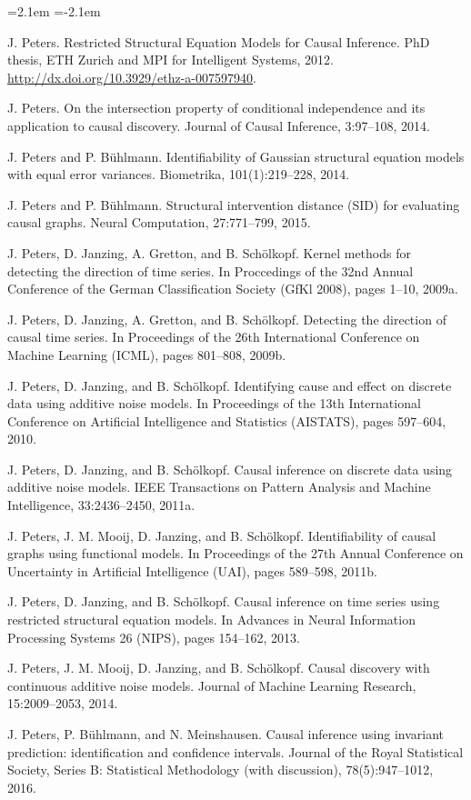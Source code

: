 \begin{list}{}{\leftmargin=2.1em
 \itemindent=-2.1em\parsep=0pt\itemsep=3pt}
\item J. Peters. Restricted Structural Equation Models for Causal Inference. PhD thesis, ETH Zurich and MPI for Intelligent Systems, 2012. \url{http://dx.doi.org/10.3929/ethz-a-007597940}.
\item J. Peters. On the intersection property of conditional independence and its application to causal discovery. Journal of Causal Inference, 3:97--108, 2014.
\item J. Peters and P. Bühlmann. Identifiability of Gaussian structural equation models with equal error variances. Biometrika, 101(1):219--228, 2014.
\item J. Peters and P. Bühlmann. Structural intervention distance (SID) for evaluating causal graphs. Neural Computation, 27:771--799, 2015.
\item J. Peters, D. Janzing, A. Gretton, and B. Schölkopf. Kernel methods for detecting the direction of time series. In Proccedings of the 32nd Annual Conference of the German Classification Society (GfKl 2008), pages 1--10, 2009a.
\item J. Peters, D. Janzing, A. Gretton, and B. Schölkopf. Detecting the direction of causal time series. In Proceedings of the 26th International Conference on Machine Learning (ICML), pages 801--808, 2009b.
\item J. Peters, D. Janzing, and B. Schölkopf. Identifying cause and effect on discrete data using additive noise models. In Proceedings of the 13th International Conference on Artificial Intelligence and Statistics (AISTATS), pages 597--604, 2010.
\item J. Peters, D. Janzing, and B. Schölkopf. Causal inference on discrete data using additive noise models. IEEE Transactions on Pattern Analysis and Machine Intelligence, 33:2436--2450, 2011a.
\item J. Peters, J. M. Mooij, D. Janzing, and B. Schölkopf. Identifiability of causal graphs using functional models. In Proceedings of the 27th Annual Conference on Uncertainty in Artificial Intelligence (UAI), pages 589--598, 2011b.
\item J. Peters, D. Janzing, and B. Schölkopf. Causal inference on time series using restricted structural equation models. In Advances in Neural Information Processing Systems 26 (NIPS), pages 154--162, 2013.
\item J. Peters, J. M. Mooij, D. Janzing, and B. Schölkopf. Causal discovery with continuous additive noise models. Journal of Machine Learning Research, 15:2009--2053, 2014.
\item J. Peters, P. Bühlmann, and N. Meinshausen. Causal inference using invariant prediction: identification and confidence intervals. Journal of the Royal Statistical Society, Series B: Statistical Methodology (with discussion), 78(5):947--1012, 2016.

\end{list}
